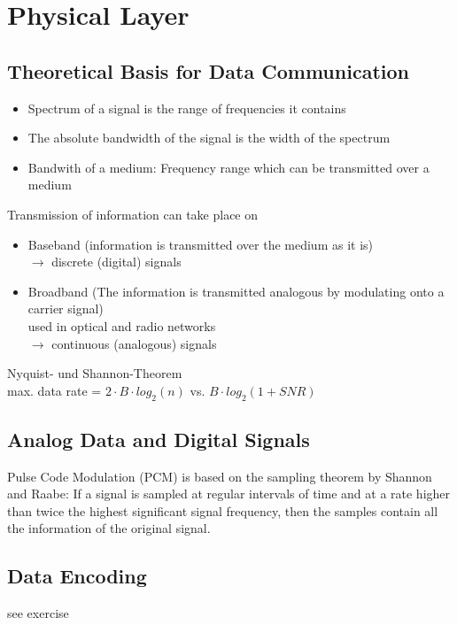 \documentclass[11pt,ngerman]{article}
\begin{document}

\section{Physical Layer}

\subsection{Theoretical	Basis	for	Data	Communication}
\begin{itemize}[noitemsep]
\item Spectrum of	a	signal	is	the	range	of	
frequencies	it	contains
\item The	absolute	bandwidth of	the	signal	
is	the	width	of	the	spectrum
\item Bandwith of a medium: Frequency	range	which	can	be	
transmitted	over	a	medium
\end{itemize}

Transmission	of	information	can	take	place	on	
\begin{itemize}[noitemsep]
\item Baseband (information	is	transmitted	over	the	medium	as	it	is)\\
	$\rightarrow$ discrete	(digital) signals
\item Broadband (The	information	is	transmitted	analogous by modulating onto a carrier signal)\\
	used in optical and radio networks\\
	$\rightarrow$ continuous	(analogous)	signals
\end{itemize}

Nyquist- und	Shannon-Theorem\\
max.	data	rate	=	$2 \cdot B \cdot log_2 (n)$ vs. $B \cdot log_2 (1+SNR)$

\subsection{Analog	Data	and	Digital	Signals}

Pulse	Code	Modulation	(PCM)	is	based	on	the	sampling	theorem	
by	Shannon	and	Raabe: If	a	signal	is	sampled	at	regular	intervals	of	time	and	at	a	rate	higher	than	twice	the	highest	
significant	signal	frequency,	then	the	samples	contain	all	the	information	of	the	original	
signal.

\subsection{Data	Encoding}
see exercise
\end{document}
